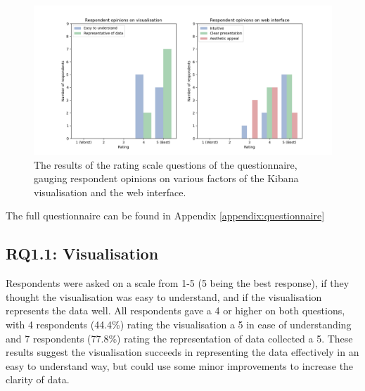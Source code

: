 \documentclass{l4proj}
\begin{document}
 \begin{figure}[h]
\centering
\includegraphics[width=\textwidth]{images/questionnaire_responses.png}
\caption{The results of the rating scale questions of the questionnaire, gauging respondent opinions on various factors of the Kibana visualisation and the web interface.}
\label{fig:questionnaire-ratings}
\end{figure}


The full questionnaire can be found in Appendix \ref{appendix:questionnaire}

\subsection{RQ1.1: Visualisation}
Respondents were asked on a scale from 1-5 (5 being the best response), if they thought the visualisation was easy to understand, and if the visualisation represents the data well. All respondents gave a 4 or higher on both questions, with 4 respondents (44.4\%) rating the visualisation a 5 in ease of understanding and 7 respondents (77.8\%) rating the representation of data collected a 5. These results suggest the visualisation succeeds in representing the data effectively in an easy to understand way, but could use some minor improvements to increase the clarity of data.
\end{document}
